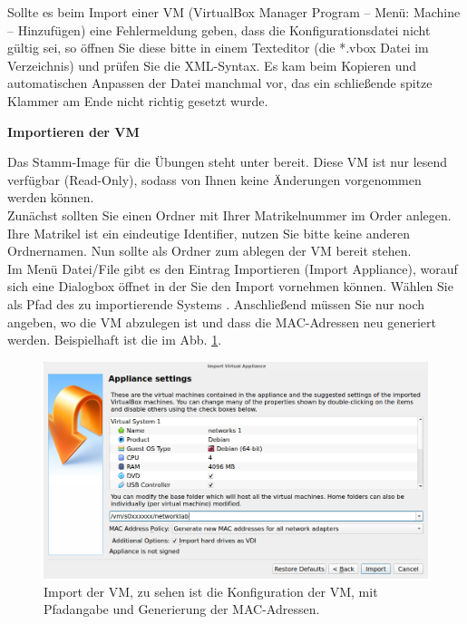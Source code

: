 \documentclass[paper=a4,fontsize=11pt]{scrartcl}%
\numberwithin{equation}{section}
\begin{document}
Sollte es beim Import einer VM (VirtualBox Manager Program -- Menü: Machine -- Hinzufügen) eine Fehlermeldung geben, dass die Konfigurationsdatei nicht gültig sei, so öffnen Sie diese bitte in einem Texteditor (die *.vbox Datei im Verzeichnis) und prüfen Sie die XML-Syntax. Es kam beim Kopieren und automatischen Anpassen der Datei manchmal vor, das ein schließende spitze Klammer am Ende nicht richtig gesetzt wurde.

\begin{center}
\Large{\textbf{Importieren der VM}}
\end{center}
Das Stamm-Image für die Übungen steht unter  bereit. Diese VM ist nur lesend verfügbar (Read-Only), sodass von Ihnen keine Änderungen vorgenommen werden können.\\
Zunächst sollten Sie einen Ordner mit Ihrer Matrikelnummer im Order  anlegen. Ihre Matrikel ist ein eindeutige Identifier, nutzen Sie bitte keine anderen Ordnernamen. Nun sollte  als Ordner zum ablegen der VM bereit stehen. \\
Im Menü Datei/File gibt es den Eintrag Importieren (Import Appliance), worauf sich eine Dialogbox öffnet in der Sie den Import vornehmen können. Wählen Sie als Pfad des zu importierende Systems . Anschließend müssen Sie nur noch angeben, wo die VM abzulegen ist und dass die MAC-Adressen neu generiert werden. Beispielhaft ist die im Abb. \ref{import_vm}.
\begin{figure}[H]
	\centering
	\includegraphics[scale=0.3]{vm_import}
	\caption{Import der VM, zu sehen ist die Konfiguration der VM, mit Pfadangabe und Generierung der MAC-Adressen.}
	\label{import_vm}
\end{figure} 
\end{document}
